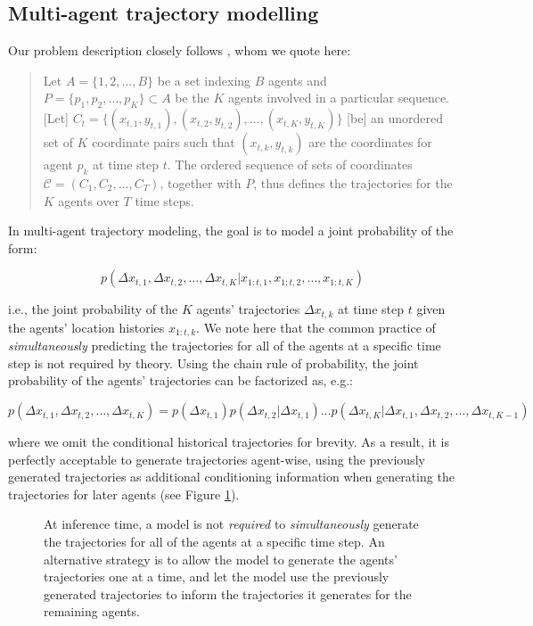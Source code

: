 \subsection{Multi-agent trajectory modelling}

Our problem description closely follows \citet{alcorn2021baller2vec}, whom we quote here:

\begin{quote}
Let $A = \{1, 2, \dots, B\}$ be a set indexing $B$ agents and $P = \{p_{1}, p_{2}, \dots, p_{K}\} \subset A$ be the $K$ agents involved in a particular sequence.
[Let] $C_{t} = \{(x_{t,1}, y_{t,1}), (x_{t,2}, y_{t,2}), \dots, (x_{t,K}, y_{t,K})\}$ [be] an unordered set of $K$ coordinate pairs such that $(x_{t,k}, y_{t,k})$ are the coordinates for agent $p_{k}$ at time step $t$.
The ordered sequence of sets of coordinates $\mathcal{C} = (C_{1}, C_{2}, \dots, C_{T})$, together with $P$, thus defines the trajectories for the $K$ agents over $T$ time steps.
\end{quote}

In multi-agent trajectory modeling, the goal is to model a joint probability of the form:

\[
     p(\Delta x_{t,1}, \Delta x_{t, 2}, \dots, \Delta x_{t, K} | x_{1:t,1}, x_{1:t,2}, \dots, x_{1:t,K})
\]

\noindent
i.e., the joint probability of the $K$ agents' trajectories $\Delta x_{t,k}$ at time step $t$ given the agents' location histories $x_{1:t,k}$.
We note here that the common practice of \textit{simultaneously} predicting the trajectories for all of the agents at a specific time step is not required by theory.
Using the chain rule of probability, the joint probability of the agents' trajectories can be factorized as, e.g.:

\[
    p(\Delta x_{t,1}, \Delta x_{t, 2}, \dots, \Delta x_{t, K}) = p(\Delta x_{t,1}) p(\Delta x_{t, 2} | \Delta x_{t,1}) \dots p(\Delta x_{t, K} | \Delta x_{t,1}, \Delta x_{t, 2}, \dots, \Delta x_{t, K - 1})
\]

where we omit the conditional historical trajectories for brevity.
As a result, it is perfectly acceptable to generate trajectories agent-wise, using the previously generated trajectories as additional conditioning information when generating the trajectories for later agents (see Figure \ref{fig:legal_dep}).

\begin{figure}[ht]
\centering
{}
\caption{
At inference time, a model is not \textit{required} to \textit{simultaneously} generate the trajectories for all of the agents at a specific time step.
An alternative strategy is to allow the model to generate the agents' trajectories one at a time, and let the model use the previously generated trajectories to inform the trajectories it generates for the remaining agents.
}
\label{fig:legal_dep}
\end{figure}

